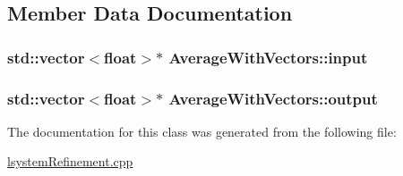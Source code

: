 \subsection{Member Data Documentation}
\hypertarget{classAverageWithVectors_a064c8c0b197c9b1724c3ee9d67313d3b}{
\subsubsection[{input}]{\setlength{\rightskip}{0pt plus 5cm}std\-::vector$<$float$>$$\ast$ Average\-With\-Vectors\-::input}}\label{classAverageWithVectors_a064c8c0b197c9b1724c3ee9d67313d3b}
\hypertarget{classAverageWithVectors_a5afd89cf9aa2cdeeaa704d4613a62802}{
\subsubsection[{output}]{\setlength{\rightskip}{0pt plus 5cm}std\-::vector$<$float$>$$\ast$ Average\-With\-Vectors\-::output}}\label{classAverageWithVectors_a5afd89cf9aa2cdeeaa704d4613a62802}


The documentation for this class was generated from the following file\-:\begin{DoxyCompactItemize}
\item 
\hyperlink{lsystemRefinement_8cpp}{lsystem\-Refinement.\-cpp}\end{DoxyCompactItemize}
